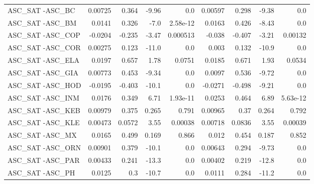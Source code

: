 \begin{tabular}{lrrrrrrrr}
ASC\_SAT -ASC\_BC                         &     0.00725 &        0.364 &   -9.96 &      0.0 &    0.00597 &       0.298 &        -9.38 &           0.0 \\
ASC\_SAT -ASC\_BM                         &      0.0141 &        0.326 &    -7.0 & 2.58e-12 &     0.0163 &       0.426 &        -8.43 &           0.0 \\
ASC\_SAT -ASC\_COP                        &     -0.0204 &       -0.235 &   -3.47 & 0.000513 &     -0.038 &      -0.407 &        -3.21 &       0.00132 \\
ASC\_SAT -ASC\_COR                        &     0.00275 &        0.123 &   -11.0 &      0.0 &      0.003 &       0.132 &        -10.9 &           0.0 \\
ASC\_SAT -ASC\_ELA                        &      0.0197 &        0.657 &    1.78 &   0.0751 &     0.0185 &       0.671 &         1.93 &        0.0534 \\
ASC\_SAT -ASC\_GIA                        &     0.00773 &        0.453 &   -9.34 &      0.0 &     0.0097 &       0.536 &        -9.72 &           0.0 \\
ASC\_SAT -ASC\_HOD                        &     -0.0195 &       -0.403 &   -10.1 &      0.0 &    -0.0271 &      -0.498 &        -9.21 &           0.0 \\
ASC\_SAT -ASC\_INM                        &      0.0176 &        0.349 &    6.71 & 1.93e-11 &     0.0253 &       0.464 &         6.89 &      5.63e-12 \\
ASC\_SAT -ASC\_KEB                        &     0.00979 &        0.375 &   0.265 &    0.791 &    0.00965 &        0.37 &        0.264 &         0.792 \\
ASC\_SAT -ASC\_KLE                        &     0.00473 &       0.0572 &    3.55 &  0.00038 &    0.00718 &      0.0836 &         3.55 &       0.00039 \\
ASC\_SAT -ASC\_MX                         &      0.0165 &        0.499 &   0.169 &    0.866 &      0.012 &       0.454 &        0.187 &         0.852 \\
ASC\_SAT -ASC\_ORN                        &     0.00901 &        0.379 &   -10.1 &      0.0 &    0.00643 &       0.294 &        -9.73 &           0.0 \\
ASC\_SAT -ASC\_PAR                        &     0.00433 &        0.241 &   -13.3 &      0.0 &    0.00402 &       0.219 &        -12.8 &           0.0 \\
ASC\_SAT -ASC\_PH                         &      0.0125 &          0.3 &   -10.7 &      0.0 &     0.0111 &       0.284 &        -11.2 &           0.0 \\

\end{tabular}
